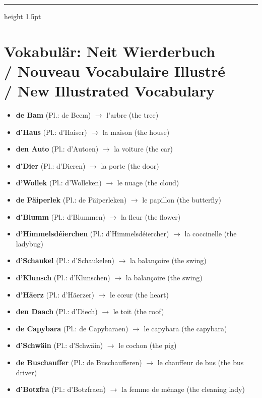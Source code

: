 \vspace{1.5cm}
\color{geminiBlue}\hrule height 1.5pt \vspace{0.5em}\color{black}

\section[Vokabulär: Neit Wierderbuch]{Vokabulär: Neit Wierderbuch \\/ Nouveau Vocabulaire Illustré \\/ New Illustrated Vocabulary}

\begin{itemize}
    \item \textbf{de Bam} (Pl.: de Beem) $\rightarrow$ l'arbre (the tree)
    \item \textbf{d'Haus} (Pl.: d'Haiser) $\rightarrow$ la maison (the house)
    \item \textbf{den Auto} (Pl.: d'Autoen) $\rightarrow$ la voiture (the car)
    \item \textbf{d'Dier} (Pl.: d'Dieren) $\rightarrow$ la porte (the door)
    \item \textbf{d'Wollek} (Pl.: d'Wolleken) $\rightarrow$ le nuage (the cloud)
    \item \textbf{de Päiperlek} (Pl.: de Päiperleken) $\rightarrow$ le papillon (the butterfly)
    \item \textbf{d'Blumm} (Pl.: d'Blummen) $\rightarrow$ la fleur (the flower)
    \item \textbf{d'Himmelsdéierchen} (Pl.: d'Himmelsdéiercher) $\rightarrow$ la coccinelle (the ladybug)
    \item \textbf{d'Schaukel} (Pl.: d'Schaukelen) $\rightarrow$ la balançoire (the swing)
    \item \textbf{d'Klunsch} (Pl.: d'Klunschen) $\rightarrow$ la balançoire (the swing)
    \item \textbf{d'Häerz} (Pl.: d'Häerzer) $\rightarrow$ le cœur (the heart)
    \item \textbf{den Daach} (Pl.: d'Diech) $\rightarrow$ le toit (the roof)
    \item \textbf{de Capybara} (Pl.: de Capybaraen) $\rightarrow$ le capybara (the capybara)
    \item \textbf{d'Schwäin} (Pl.: d'Schwäin) $\rightarrow$ le cochon (the pig)
    \item \textbf{de Buschauffer} (Pl.: de Buschaufferen) $\rightarrow$ le chauffeur de bus (the bus driver)
    \item \textbf{d'Botzfra} (Pl.: d'Botzfraen) $\rightarrow$ la femme de ménage (the cleaning lady)

\end{itemize}
